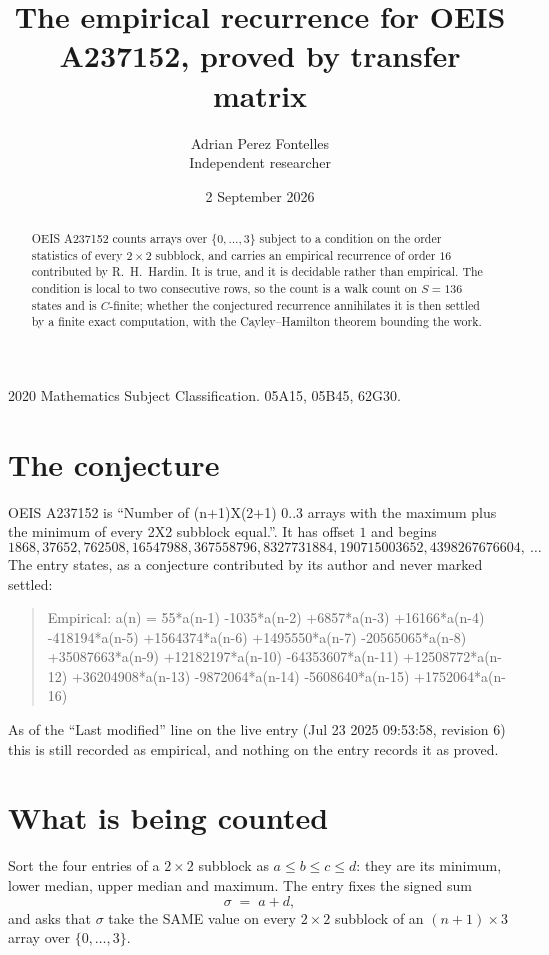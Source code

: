 \documentclass[11pt,a4paper]{article}
\title{The empirical recurrence for OEIS A237152, proved by transfer matrix}
\author{Adrian Perez Fontelles\\ \small Independent researcher}
\date{2 September 2026}
\theoremstyle{plain}
\theoremstyle{definition}
\begin{document}
\maketitle

\begin{abstract}
OEIS A237152 counts arrays over $\{0,\dots,3\}$ subject to a condition on the order
statistics of every $2\times2$ subblock, and carries an empirical recurrence of order
$16$ contributed by R.~H.~Hardin. It is true, and it is decidable rather than empirical.
The condition is local to two consecutive rows, so the count is a walk count on $S=136$
states and is $C$-finite; whether the conjectured recurrence annihilates it is then settled by
a finite exact computation, with the Cayley--Hamilton theorem bounding the work.
\end{abstract}

\noindent\small 2020 Mathematics Subject Classification. 05A15, 05B45, 62G30.\normalsize

\section{The conjecture}

OEIS A237152 is ``Number of (n+1)X(2+1) 0..3 arrays with the maximum plus the minimum of every 2X2 subblock equal.''. It has offset $1$ and begins
\[
1868, 37652, 762508, 16547988, 367558796, 8327731884, 190715003652, 4398267676604,\ \dots
\]
The entry states, as a conjecture contributed by its author and never marked settled:
\begin{quote}
Empirical: a(n) = 55*a(n-1) -1035*a(n-2) +6857*a(n-3) +16166*a(n-4) -418194*a(n-5) +1564374*a(n-6) +1495550*a(n-7) -20565065*a(n-8) +35087663*a(n-9) +12182197*a(n-10) -64353607*a(n-11) +12508772*a(n-12) +36204908*a(n-13) -9872064*a(n-14) -5608640*a(n-15) +1752064*a(n-16)
\end{quote}
As of the ``Last modified'' line on the live entry (Jul 23 2025 09:53:58, revision 6) this is still
recorded as empirical, and nothing on the entry records it as proved.

\section{What is being counted}

Sort the four entries of a $2\times2$ subblock as $a\le b\le c\le d$: they
are its minimum, lower median, upper median and maximum. The entry fixes the signed sum
\[
\sigma\;=\;a+d,
\]
and asks that $\sigma$ take the SAME value on every $2\times2$ subblock of an
$(n+1)\times3$ array over $\{0,\dots,3\}$.
\end{document}
